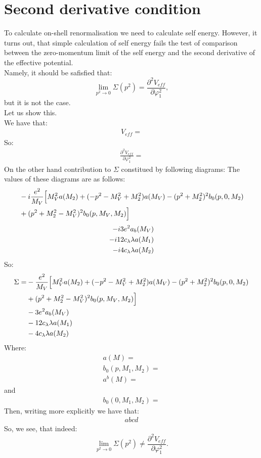 \section{Second derivative condition}
To calculate on-shell renormalisation we need to calculate self energy. 
However, it turns out, that simple calculation of self energy fails the test of 
comparison between the zero-momentum limit of the self energy and the second derivative 
of the effective potential. \\
Namely, it should be safisfied that:
\begin{equation}\label{second_derivativ_condition}
\lim\limits_{p^2\to 0}\Sigma(p^2)=\frac{\partial^2V_{eff}}{\partial\varphi_1^2},
\end{equation}
but it is not the case. \\
Let us show this. \\
We have that:
\begin{align}
V_{eff} = 
\end{align}
So:
\begin{align}
\frac{\partial^2V_{eff}}{\partial\varphi_1^2} = 
\end{align}
On the other hand contribution to $\Sigma$ constitued by following diagrams: 
The values of these diagrams are as follows:
\begin{align}
&-i\frac{e^2}{M_V}\Big[M_V^2a(M_2)+(-p^2-M_V^2+M_2^2)a(M_V)-(p^2+M_2^2)^2b_0(p,0,M_2) 
\notag\\ 
&+(p^2+M_2^2-M_V^2)^2b_0(p,M_V,M_2)\Big]
\end{align}
\begin{align}
-i3e^2a_b(M_V) \\
-i12c_\lambda\lambda a(M_1) \\
-i4c_\lambda\lambda a(M_2) 
\end{align}
So:
\begin{align}
\Sigma = &-\frac{e^2}{M_V}\Big[M_V^2a(M_2)+(-p^2-M_V^2+M_2^2)a(M_V)-(p^2+M_2^2)^2b_0(p,0,M_2) 
\notag\\ 
&+(p^2+M_2^2-M_V^2)^2b_0(p,M_V,M_2)\Big] \notag \\
&-3e^2a_b(M_V) \notag\\
&-12c_\lambda\lambda a(M_1)\notag \\
&-4c_\lambda\lambda a(M_2) 
\end{align}
Where:
\begin{align}
a(M) = \\
b_0(p,M_1,M_2) = \\
a^b(M) = 
\end{align}
and
\begin{align}
b_0(0,M_1,M_2) = 
\end{align}
Then, writing more explicitly we have that:
\begin{align}
abcd
\end{align}
So, we see, that indeed:
\begin{equation}
\lim\limits_{p^2\to 0}\Sigma(p^2) \neq \frac{\partial^2V_{eff}}{\partial\varphi_1^2}.
\end{equation}
